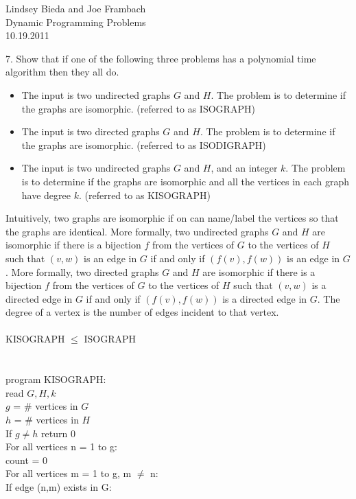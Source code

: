 \documentclass[10pt]{article}
\newcommand{\tab}{\hspace*{2em}}
\newcommand{\tabb}{\hspace*{4em}}
\newcommand{\tabbb}{\hspace*{6em}}
\begin{document}
	\begin{flushright}
	Lindsey Bieda and Joe Frambach\\
	Dynamic Programming Problems\\
	10.19.2011
	\end{flushright}
		7. Show that if one of the following three problems has a polynomial time algorithm then they all do.
		\begin{itemize}
		\item The input is two undirected graphs $G$ and $H$. The problem is to determine if the graphs are
		isomorphic. (referred to as ISOGRAPH)
		\item The input is two directed graphs $G$ and $H$. The problem is to determine if the graphs are
		isomorphic. (referred to as ISODIGRAPH)
		\item The input is two undirected graphs $G$ and $H$, and an integer $k$. The problem is to determine if
			  the graphs are isomorphic and all the vertices in each graph have degree $k$. (referred to as KISOGRAPH)
		\end{itemize}
		Intuitively, two graphs are isomorphic if on can name/label the vertices so that the graphs are identical.
		More formally, two undirected graphs $G$ and $H$ are isomorphic if there is a bijection $f$ from the vertices
		of $G$ to the vertices of $H$ such that $(v, w)$ is an edge in $G$ if and only if $(f (v), f (w))$ is an edge in $G$.
		More formally, two directed graphs $G$ and $H$ are isomorphic if there is a bijection $f$ from the vertices
		of $G$ to the vertices of $H$ such that $(v, w)$ is a directed edge in $G$ if and only if $(f (v), f (w))$ is a directed
		edge in $G$. The degree of a vertex is the number of edges incident to that vertex.
		\\
		\\
		KISOGRAPH $\leq$ ISOGRAPH\\
		\\
		\\
		program KISOGRAPH:\\
		\tab read $G,H,k$\\
		\tab $g$ = \# vertices in $G$\\
		\tab $h$ = \# vertices in $H$\\
		\tab If $g \neq h$ return 0\\
		\tab For all vertices n = 1 to g:\\
		\tabb count = 0\\
		\tabb For all vertices m = 1 to g, m $\neq$ n:\\
		\tabbb If edge (n,m) exists in G:\\
\end{document}
